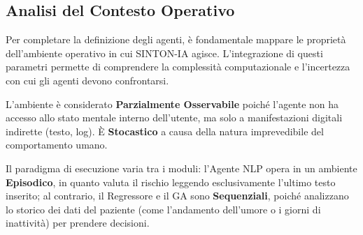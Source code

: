 \subsection{Analisi del Contesto Operativo}
\label{subsec:task_environment}

Per completare la definizione degli agenti, è fondamentale mappare le proprietà dell’ambiente operativo in cui SINTON-IA agisce. L'integrazione di questi parametri permette di comprendere la complessità computazionale e l’incertezza con cui gli agenti devono confrontarsi.

\begin{table}[H]
    \centering
    \renewcommand{\arraystretch}{1.5}
    \small
    \caption{Proprietà dell'ambiente per i tre moduli di SINTON-IA.}
    \label{tab:task_environment}
\end{table}

L'ambiente è considerato \textbf{Parzialmente Osservabile} poiché l'agente non ha accesso allo stato mentale interno dell'utente, ma solo a manifestazioni digitali indirette (testo, log). È \textbf{Stocastico} a causa della natura imprevedibile del comportamento umano.

Il paradigma di esecuzione varia tra i moduli: l'Agente NLP opera in un ambiente \textbf{Episodico}, in quanto valuta il rischio leggendo esclusivamente l'ultimo testo inserito; al contrario, il Regressore e il GA sono \textbf{Sequenziali}, poiché analizzano lo storico dei dati del paziente (come l'andamento dell'umore o i giorni di inattività) per prendere decisioni.

